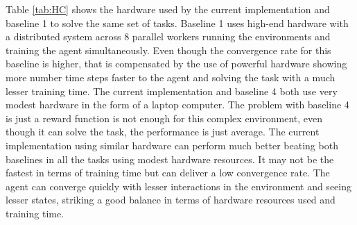 Table \ref{tab:HC} shows the hardware used by the current implementation and baseline 1 to solve the same set of tasks. Baseline 1 uses high-end hardware with a distributed system across 8 parallel workers running the environments and training the agent simultaneously. Even though the convergence rate for this baseline is higher, that is compensated by the use of powerful hardware showing more number time steps faster to the agent and solving the task with a much lesser training time. The current implementation and baseline 4 both use very modest hardware in the form of a laptop computer. The problem with baseline 4 is just a reward function is not enough for this complex environment, even though it can solve the task, the performance is just average. The current implementation using similar hardware can perform much better beating both baselines in all the tasks using modest hardware resources. It may not be the fastest in terms of training time but can deliver a low convergence rate. The agent can converge quickly with lesser interactions in the environment and seeing lesser states, striking a good balance in terms of hardware resources used and training time. \\